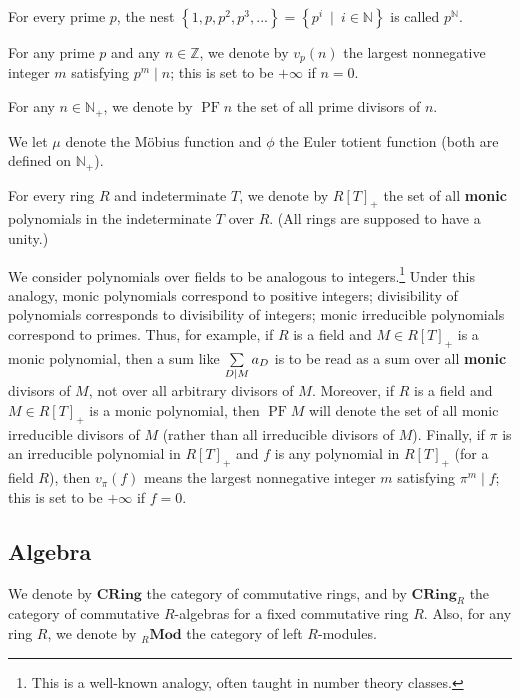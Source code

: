 \documentclass[numbers=enddot,12pt,final,onecolumn,notitlepage]{scrartcl}%
\theoremstyle{definition}
\let\sumnonlimits\sum
\renewcommand{\sum}{\sumnonlimits\limits}
\begin{document}
For every prime $p$, the nest $\left\{  1,p,p^{2},p^{3},...\right\}  =\left\{
p^{i}\ \mid\ i\in\mathbb{N}\right\}  $ is called $p^{\mathbb{N}}$.

For any prime $p$ and any $n\in\mathbb{Z}$, we denote by $v_{p}\left(
n\right)  $ the largest nonnegative integer $m$ satisfying $p^{m}\mid n$; this
is set to be $+\infty$ if $n=0$.

For any $n\in\mathbb{N}_{+}$, we denote by $\operatorname{PF}n$ the set of all
prime divisors of $n$.

We let $\mu$ denote the M\"{o}bius function and $\phi$ the Euler totient
function (both are defined on $\mathbb{N}_{+}$).

For every ring $R$ and indeterminate $T$, we denote by $R\left[  T\right]
_{+}$ the set of all \textbf{monic} polynomials in the indeterminate $T$ over
$R$. (All rings are supposed to have a unity.)

We consider polynomials over fields to be analogous to integers.\footnote{This
is a well-known analogy, often taught in number theory classes.} Under this
analogy, monic polynomials correspond to positive integers; divisibility of
polynomials corresponds to divisibility of integers; monic irreducible
polynomials correspond to primes. Thus, for example, if $R$ is a field and
$M\in R\left[  T\right]  _{+}$ is a monic polynomial, then a sum like
$\sum\limits_{D\mid M}a_{D}$ is to be read as a sum over all \textbf{monic}
divisors of $M$, not over all arbitrary divisors of $M$. Moreover, if $R$ is a
field and $M\in R\left[  T\right]  _{+}$ is a monic polynomial, then
$\operatorname*{PF}M$ will denote the set of all monic irreducible divisors of
$M$ (rather than all irreducible divisors of $M$). Finally, if $\pi$ is an
irreducible polynomial in $R\left[  T\right]  _{+}$ and $f$ is any polynomial
in $R\left[  T\right]  _{+}$ (for a field $R$), then $v_{\pi}\left(  f\right)
$ means the largest nonnegative integer $m$ satisfying $\pi^{m}\mid f$; this
is set to be $+\infty$ if $f=0$.

\subsection{Algebra}

We denote by $\mathbf{CRing}$ the category of commutative rings, and by
$\mathbf{CRing}_{R}$ the category of commutative $R$-algebras for a fixed
commutative ring $R$. Also, for any ring $R$, we denote by $_{R}\mathbf{Mod}$
the category of left $R$-modules.
\end{document}
